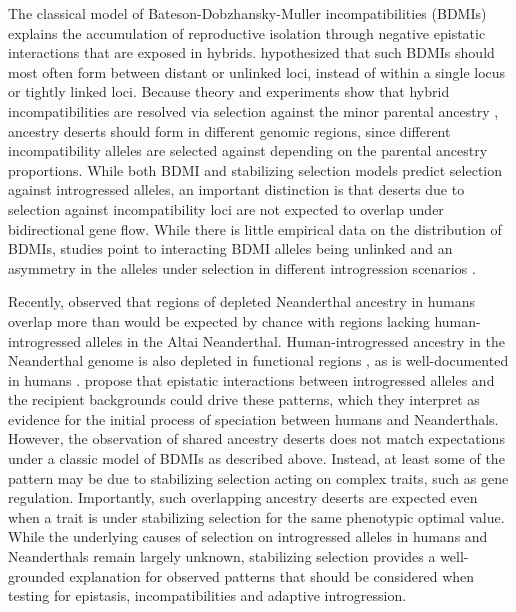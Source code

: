 \documentclass{article}
\begin{document}
The classical model of Bateson-Dobzhansky-Muller incompatibilities (BDMIs)
\citep{bateson1909heredity, dobzhansky1936studies, muller1942isolating}
explains the accumulation of reproductive isolation through negative epistatic
interactions that are exposed in hybrids. \citet{muller1942isolating}
hypothesized that such BDMIs should most often form between distant or unlinked
loci, instead of within a single locus or tightly linked loci. Because theory
and experiments show that hybrid incompatibilities are resolved via selection
against the minor parental ancestry \citep{matute2020rapid, moran2021genomic},
ancestry deserts should form in different genomic regions, since different
incompatibility alleles are selected against depending on the parental ancestry
proportions. While both BDMI and stabilizing selection models predict selection
against introgressed alleles, an important distinction is that deserts due to
selection against incompatibility loci are not expected to overlap under
bidirectional gene flow. While there is little empirical data on the
distribution of BDMIs, studies point to interacting BDMI alleles being unlinked
\citep{presgraves2003fine, li2022imbalanced} and an asymmetry in the alleles
under selection in different introgression scenarios
\citep{maheshwari2011genetics, moran2021genomic}.

Recently, \citet{harris2023diverse} observed that regions of depleted Neanderthal
ancestry in humans overlap more than would be expected by chance with regions
lacking human-introgressed alleles in the Altai Neanderthal.
Human-introgressed ancestry in the Neanderthal genome is also depleted in
functional regions \citep{harris2023diverse}, as is well-documented in humans
\citep{sankararaman2014genomic, sankararaman2016combined}.
\citet{harris2023diverse} propose that epistatic interactions between
introgressed alleles and the recipient backgrounds could drive these patterns,
which they interpret as evidence for the initial process of speciation between
humans and Neanderthals. However, the observation of shared ancestry deserts
does not match expectations under a classic model of BDMIs as described above.
Instead, at least some of the pattern may be due to stabilizing selection
acting on complex traits, such as gene regulation. Importantly, such
overlapping ancestry deserts are expected even when a trait is under
stabilizing selection for the same phenotypic optimal value. While the
underlying causes of selection on introgressed alleles in humans and
Neanderthals remain largely unknown, stabilizing selection provides a
well-grounded explanation for observed patterns that should be considered when
testing for epistasis, incompatibilities and adaptive introgression.
\end{document}
